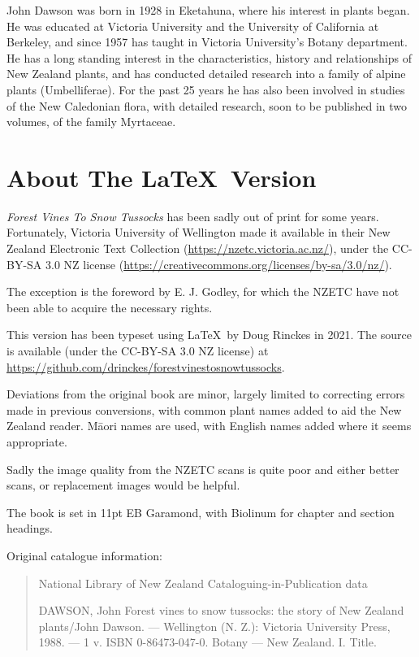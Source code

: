 John Dawson was born in 1928 in Eketahuna, where his interest in plants began.
He was educated at Victoria University and the University of California at Berkeley, and since 1957 has taught in Victoria University's Botany department.
He has a long standing interest in the characteristics, history and relationships of New Zealand plants, and has conducted detailed research into a family of alpine plants (Umbelliferae).
For the past 25 years he has also been involved in studies of the New Caledonian flora, with detailed research, soon to be published in two volumes, of the family Myrtaceae.

\section*{About The \LaTeX\ Version}

\emph{Forest Vines To Snow Tussocks} has been sadly out of print for some years.
Fortunately, Victoria University of Wellington made it available in their New Zealand Electronic Text Collection (\url{https://nzetc.victoria.ac.nz/}), under the CC-BY-SA 3.0 NZ license (\url{https://creativecommons.org/licenses/by-sa/3.0/nz/}).

The exception is the foreword by E. J. Godley, for which the NZETC have not been able to acquire the necessary rights.

This version has been typeset using \LaTeX\ by Doug Rinckes in 2021.
The source is available (under the CC-BY-SA 3.0 NZ license) at \url{https://github.com/drinckes/forestvinestosnowtussocks}.

Deviations from the original book are minor, largely limited to correcting errors made in previous conversions, with common plant names added to aid the New Zealand reader.
Māori names are used, with English names added where it seems appropriate.

Sadly the image quality from the NZETC scans is quite poor and either better scans, or replacement images would be helpful.

The book is set in 11pt EB Garamond, with Biolinum for chapter and section headings.

Original catalogue information:

\begin{quote}
	National Library of New Zealand\newline
	Cataloguing-in-Publication data

	DAWSON, John\newline
	Forest vines to snow tussocks: the story of New Zealand plants/John Dawson. --- Wellington (N. Z.): Victoria University Press, 1988. --- 1 v.\newline
	ISBN 0-86473-047-0. Botany --- New Zealand. I. Title.\newline
\end{quote}



